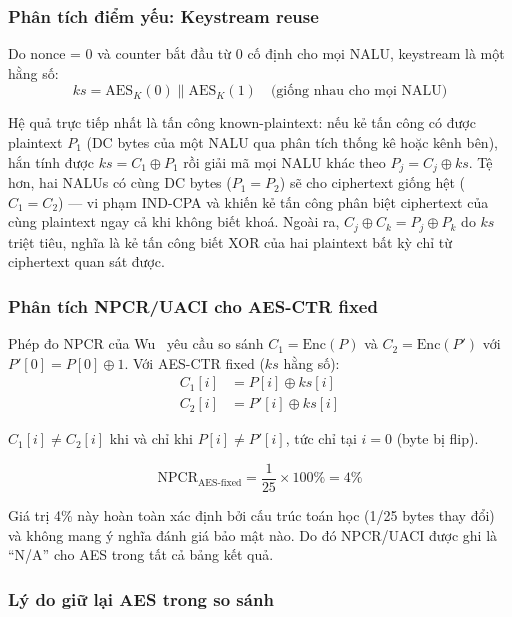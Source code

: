 \subsubsection{Phân tích điểm yếu: Keystream reuse}

Do nonce = 0 và counter bắt đầu từ 0 cố định cho mọi NALU, keystream là một hằng số:
\begin{equation}
ks = \text{AES}_K(0) \| \text{AES}_K(1) \quad \text{(giống nhau cho mọi NALU)}
\end{equation}

Hệ quả trực tiếp nhất là tấn công known-plaintext: nếu kẻ tấn công có được plaintext $P_1$ (DC bytes của một NALU qua phân tích thống kê hoặc kênh bên), hắn tính được $ks = C_1 \oplus P_1$ rồi giải mã mọi NALU khác theo $P_j = C_j \oplus ks$. Tệ hơn, hai NALUs có cùng DC bytes ($P_1 = P_2$) sẽ cho ciphertext giống hệt ($C_1 = C_2$) --- vi phạm IND-CPA và khiến kẻ tấn công phân biệt ciphertext của cùng plaintext ngay cả khi không biết khoá. Ngoài ra, $C_j \oplus C_k = P_j \oplus P_k$ do $ks$ triệt tiêu, nghĩa là kẻ tấn công biết XOR của hai plaintext bất kỳ chỉ từ ciphertext quan sát được.

\subsubsection{Phân tích NPCR/UACI cho AES-CTR fixed}

Phép đo NPCR của Wu~\cite{wu_npcr} yêu cầu so sánh $C_1 = \text{Enc}(P)$ và $C_2 = \text{Enc}(P')$ với $P'[0] = P[0] \oplus 1$. Với AES-CTR fixed ($ks$ hằng số):
\begin{align}
C_1[i] &= P[i] \oplus ks[i] \\
C_2[i] &= P'[i] \oplus ks[i]
\end{align}

$C_1[i] \neq C_2[i]$ khi và chỉ khi $P[i] \neq P'[i]$, tức chỉ tại $i = 0$ (byte bị flip).

\begin{equation}
\text{NPCR}_{\text{AES-fixed}} = \frac{1}{25} \times 100\% = 4\%
\end{equation}

Giá trị 4\% này hoàn toàn xác định bởi cấu trúc toán học (1/25 bytes thay đổi) và không mang ý nghĩa đánh giá bảo mật nào. Do đó NPCR/UACI được ghi là ``N/A'' cho AES trong tất cả bảng kết quả.

\subsubsection{Lý do giữ lại AES trong so sánh}

